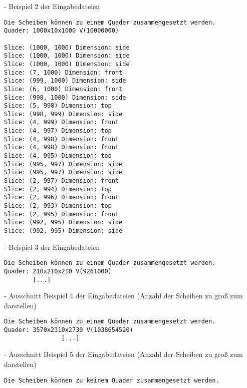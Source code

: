\documentclass[a4paper,10pt,ngerman]{scrartcl}
\begin{document}
    - Beispiel 2 der Eingabedateien

    \newpage


    \begin{lstlisting}[frame=single, title=Programmausgabe kaese3.txt, breaklines=true,label={lst:lstlisting8}]
Die Scheiben können zu einem Quader zusammengesetzt werden.
Quader: 1000x10x1000 V(10000000)

Slice: (1000, 1000) Dimension: side
Slice: (1000, 1000) Dimension: side
Slice: (1000, 1000) Dimension: side
Slice: (7, 1000) Dimension: front
Slice: (999, 1000) Dimension: side
Slice: (6, 1000) Dimension: front
Slice: (998, 1000) Dimension: side
Slice: (5, 998) Dimension: top
Slice: (998, 999) Dimension: side
Slice: (4, 999) Dimension: front
Slice: (4, 997) Dimension: top
Slice: (4, 998) Dimension: front
Slice: (4, 998) Dimension: front
Slice: (4, 995) Dimension: top
Slice: (995, 997) Dimension: side
Slice: (995, 997) Dimension: side
Slice: (2, 997) Dimension: front
Slice: (2, 994) Dimension: top
Slice: (2, 996) Dimension: front
Slice: (2, 993) Dimension: top
Slice: (2, 995) Dimension: front
Slice: (992, 995) Dimension: side
Slice: (992, 995) Dimension: side
    \end{lstlisting}

    - Beispiel 3 der Eingabedateien

    \begin{lstlisting}[frame=single, title=Ausschnitt der Programmausgabe kaese4.txt, breaklines=true,label={lst:lstlisting9}]
    Die Scheiben können zu einem Quader zusammengesetzt werden.
Quader: 210x210x210 V(9261000)
        [...]
    \end{lstlisting}

    - Ausschnitt Beispiel 4 der Eingabedateien
    (Anzahl der Scheiben zu groß zum darstellen)

    \begin{lstlisting}[frame=single, title=Ausschnitt der Programmausgabe kaese5.txt, breaklines=true,label={lst:lstlisting10}]
    Die Scheiben können zu einem Quader zusammengesetzt werden.
Quader: 3570x2310x2730 V(1038654520)
                [...]
    \end{lstlisting}

    - Ausschnitt Beispiel 5 der Eingabedateien
    (Anzahl der Scheiben zu groß zum darstellen)

    \begin{lstlisting}[frame=single, title=Programmausgabe kaese6.txt, breaklines=true,label={lst:lstlisting11}]
    Die Scheiben können zu keinem Quader zusammengesetzt werden.
    \end{lstlisting}
\end{document}
